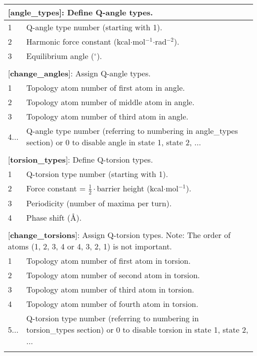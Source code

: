 \documentclass[a4paper,10pt]{article}
\begin{document}
\begin{longtable}{|p{53pt}|p{181pt}|p{160pt}|}
\multicolumn{3}{p{394pt}}{[\textbf{angle\_types}]: Define Q-angle types.}\\
\hline 1 & \multicolumn{2}{p{341pt}|}{Q-angle type number (starting with 1).}\\
\hline 2 & \multicolumn{2}{p{341pt}|}{Harmonic force constant (kcal$\cdot$mol$^{-1}$$\cdot$rad$^{-2}$).}\\
\hline 3 & \multicolumn{2}{p{341pt}|}{Equilibrium angle ($^{\circ}$).}\\
\hline
\multicolumn{3}{p{394pt}}{}\\

\multicolumn{3}{p{394pt}}{[\textbf{change\_angles}]: Assign Q-angle types.}\\
\hline 1 & \multicolumn{2}{p{341pt}|}{Topology atom number of first atom in angle.}\\
\hline 2 & \multicolumn{2}{p{341pt}|}{Topology atom number of middle atom in angle.}\\
\hline 3 & \multicolumn{2}{p{341pt}|}{Topology atom number of third atom in angle.}\\
\hline 4... & \multicolumn{2}{p{341pt}|}{Q-angle type number (referring to numbering in angle\_types section) or 0 to disable angle in state 1, state 2, ...}\\
\hline
\multicolumn{3}{p{394pt}}{}\\

\multicolumn{3}{p{394pt}}{[\textbf{torsion\_types}]: Define Q-torsion types.}\\
\hline 1 & \multicolumn{2}{p{341pt}|}{Q-torsion type number (starting with 1).}\\
\hline 2 & \multicolumn{2}{p{341pt}|}{Force constant = $\frac{1}{2}\cdot$barrier height (kcal$\cdot$mol$^{-1}$).}\\
\hline 3 & \multicolumn{2}{p{341pt}|}{Periodicity (number of maxima per turn).}\\
\hline 4 & \multicolumn{2}{p{341pt}|}{Phase shift (\AA).}\\
\hline
\multicolumn{3}{p{394pt}}{}\\

\multicolumn{3}{p{394pt}}{[\textbf{change\_torsions}]: Assign Q-torsion types. Note: The order of atoms (1, 2, 3, 4 or 4, 3, 2, 1) is not important.}\\
\hline 1 & \multicolumn{2}{p{341pt}|}{Topology atom number of first atom in torsion.}\\
\hline 2 & \multicolumn{2}{p{341pt}|}{Topology atom number of second atom in torsion.}\\
\hline 3 & \multicolumn{2}{p{341pt}|}{Topology atom number of third atom in torsion.}\\
\hline 4 & \multicolumn{2}{p{341pt}|}{Topology atom number of fourth atom in torsion.}\\
\hline 5... & \multicolumn{2}{p{341pt}|}{Q-torsion type number (referring to numbering in torsion\_types section) or 0 to disable torsion in state 1, state 2, ...}\\
\hline
\multicolumn{3}{p{394pt}}{}\\


\end{longtable}
\end{document}
